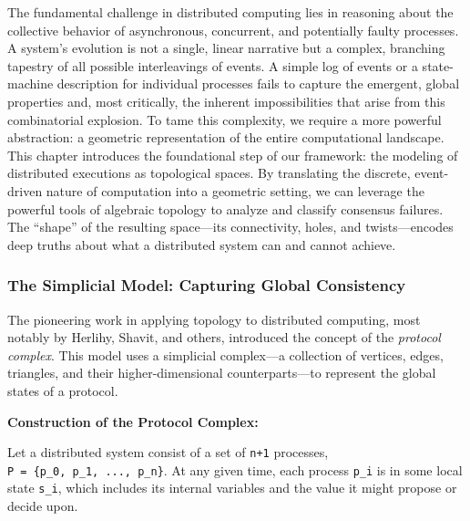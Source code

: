 \documentclass[
]{article}
\begin{document}
The fundamental challenge in distributed computing lies in reasoning
about the collective behavior of asynchronous, concurrent, and
potentially faulty processes. A system's evolution is not a single,
linear narrative but a complex, branching tapestry of all possible
interleavings of events. A simple log of events or a state-machine
description for individual processes fails to capture the emergent,
global properties and, most critically, the inherent impossibilities
that arise from this combinatorial explosion. To tame this complexity,
we require a more powerful abstraction: a geometric representation of
the entire computational landscape. This chapter introduces the
foundational step of our framework: the modeling of distributed
executions as topological spaces. By translating the discrete,
event-driven nature of computation into a geometric setting, we can
leverage the powerful tools of algebraic topology to analyze and
classify consensus failures. The ``shape'' of the resulting space---its
connectivity, holes, and twists---encodes deep truths about what a
distributed system can and cannot achieve.

\subsubsection{\texorpdfstring{\textbf{The Simplicial Model: Capturing
Global
Consistency}}{The Simplicial Model: Capturing Global Consistency}}\label{the-simplicial-model-capturing-global-consistency}

The pioneering work in applying topology to distributed computing, most
notably by Herlihy, Shavit, and others, introduced the concept of the
\emph{protocol complex}. This model uses a simplicial complex---a
collection of vertices, edges, triangles, and their higher-dimensional
counterparts---to represent the global states of a protocol.

\textbf{Construction of the Protocol Complex:}

Let a distributed system consist of a set of \texttt{n+1} processes,
\texttt{P\ =\ \{p\_0,\ p\_1,\ ...,\ p\_n\}}. At any given time, each
process \texttt{p\_i} is in some local state \texttt{s\_i}, which
includes its internal variables and the value it might propose or decide
upon.
\end{document}
